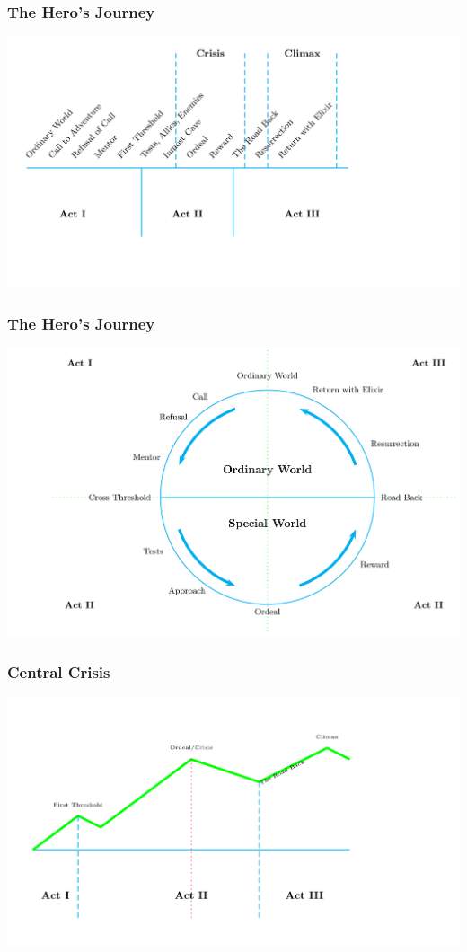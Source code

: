 \documentclass{beamer}
\begin{document}
\begin{frame}\frametitle{The Hero's Journey}
\includegraphics[scale=0.25]{herofig01.png}
\end{frame}

\begin{frame}\frametitle{The Hero's Journey}
\hspace{-0.75in}\includegraphics[scale=0.18]{herofig02.png}
\end{frame}

\begin{frame}\frametitle{Central Crisis}
\includegraphics[scale=0.25]{herofig03.png}
\end{frame}
\end{document}
